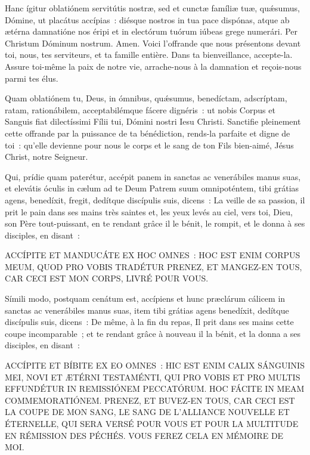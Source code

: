 \begin{paracol}{2}
\LigneParacol{0cm}
{}{}

\LigneParacol{0cm}
{Hanc ígitur oblatiónem servitútis nostræ, sed et cunctæ famíliæ tuæ, quǽsumus, Dómine, ut placátus accípias~: diésque nostros in tua pace dispónas, atque ab ætérna damnatióne nos éripi et in electórum tuórum iúbeas grege numerári. Per Christum Dóminum nostrum. Amen.}
{Voici l'offrande que nous présentons devant toi, nous, tes serviteurs, et ta famille entière. Dans ta bienveillance, accepte-la. Assure toi-même la paix de notre vie, arrache-nous à la damnation et reçois-nous parmi tes élus.}

\LigneParacol{0cm}
{Quam oblatiónem tu, Deus, in ómnibus, quǽsumus, benedíctam, adscríptam, ratam, rationábilem, acceptabilémque fácere dignéris~: ut nobis Corpus et Sanguis fiat dilectíssimi Fílii tui, Dómini nostri Iesu Christi.}
{Sanctifie pleinement cette offrande par la puissance de ta bénédiction, rends-la parfaite et digne de toi~: qu'elle devienne pour nous le corps et le sang de ton Fils bien-aimé, Jésus Christ, notre Seigneur.}

\LigneParacol{0cm}
{Qui, prídie quam paterétur, accépit panem in sanctas ac venerábiles manus suas, et elevátis óculis in cælum ad te Deum Patrem suum omnipoténtem, tibi grátias agens, benedíxit, fregit, dedítque discípulis suis, dicens~:\vspace{0.3cm}}
{La veille de sa passion, il prit le pain dans ses mains très saintes et, les yeux levés au ciel, vers toi, Dieu, son Père tout-puissant, en te rendant grâce il le bénit, le rompit, et le donna à ses disciples, en disant~:\vspace{0.3cm}}

\LigneParacol{0cm}
{ACCÍPITE ET MANDUCÁTE EX HOC OMNES~: HOC EST ENIM CORPUS MEUM, QUOD PRO VOBIS TRADÉTUR\vspace{0.3cm}}
{PRENEZ, ET MANGEZ-EN TOUS, CAR CECI EST MON CORPS, LIVRÉ POUR VOUS.\vspace{0.3cm}}

\LigneParacol{0cm}
{Símili modo, postquam cenátum est, accípiens et hunc præclárum cálicem in sanctas ac venerábiles manus suas, item tibi grátias agens benedíxit, dedítque discípulis suis, dicens~:\vspace{0.3cm}}
{De même, à la fin du repas, Il prit dans ses mains cette coupe incomparable~; et te rendant grâce à nouveau il la bénit, et la donna a ses disciples, en disant~:\vspace{0.3cm}}

\LigneParacol{0cm}
{ACCÍPITE ET BÍBITE EX EO OMNES~: HIC EST ENIM CALIX SÁNGUINIS MEI, NOVI ET ÆTÉRNI TESTAMÉNTI, QUI PRO VOBIS ET PRO MULTIS EFFUNDÉTUR IN REMISSIÓNEM PECCATÓRUM. HOC FÁCITE IN MEAM COMMEMORATIÓNEM.\vspace{0.3cm}}
{PRENEZ, ET BUVEZ-EN TOUS, CAR CECI EST LA COUPE DE MON SANG, LE SANG DE L'ALLIANCE NOUVELLE ET ÉTERNELLE, QUI SERA VERSÉ POUR VOUS ET POUR LA MULTITUDE EN RÉMISSION DES PÉCHÉS. VOUS FEREZ CELA EN MÉMOIRE DE MOI.\vspace{0.3cm}}

\end{paracol}

